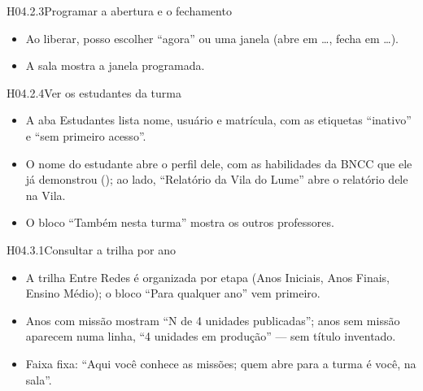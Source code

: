 \begin{historia}{H04.2.3}{Programar a abertura e o fechamento}{\afazer}
\aceiteproposta
\begin{itemize}
  \item Ao liberar, posso escolher \enquote{agora} ou uma janela (abre em
    \ldots{}, fecha em \ldots{}).
  \item A sala mostra a janela programada.
\end{itemize}
\end{historia}

\begin{historia}{H04.2.4}{Ver os estudantes da turma}{\pronto}
\aceite
\begin{itemize}
  \item A aba Estudantes lista nome, usuário e matrícula, com as etiquetas
    \enquote{inativo} e \enquote{sem primeiro acesso}.
  \item O nome do estudante abre o perfil dele, com as habilidades da BNCC que
    ele já demonstrou (); ao lado, \enquote{Relatório da Vila do
    Lume} abre o relatório dele na Vila.
  \item O bloco \enquote{Também nesta turma} mostra os outros professores.
\end{itemize}
\end{historia}


\begin{historia}{H04.3.1}{Consultar a trilha por ano}{\pronto}
\aceite
\begin{itemize}
  \item A trilha Entre Redes é organizada por etapa (Anos Iniciais, Anos
    Finais, Ensino Médio); o bloco \enquote{Para qualquer ano} vem primeiro.
  \item Anos com missão mostram \enquote{N de 4 unidades publicadas}; anos sem
    missão aparecem numa linha, \enquote{4 unidades em produção} --- sem
    título inventado.
  \item Faixa fixa: \enquote{Aqui você conhece as missões; quem abre para a
    turma é você, na sala}.
\end{itemize}
\end{historia}

